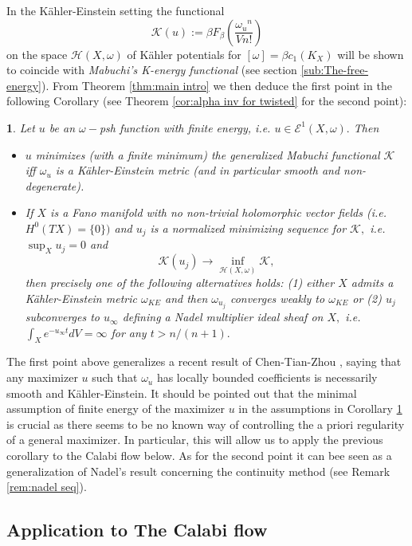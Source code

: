 \documentclass[11pt,oneside,english]{amsart}
\numberwithin{equation}{section}
\numberwithin{figure}{section}
\theoremstyle{plain}
\theoremstyle{plain}
\newtheorem{cor}[thm]{\protect\corollaryname}
\theoremstyle{plain}
\theoremstyle{plain}
\theoremstyle{remark}
\theoremstyle{definition}
\providecommand{\corollaryname}{Corollary}
\begin{document}
In the Kähler-Einstein setting the functional 
\begin{equation}
\mathcal{K}(u):=\beta F_{\beta}(\frac{\omega_{u}{}^{n}}{Vn!})\label{eq:mab f intro}
\end{equation}
 on the space $\mathcal{H}(X,\omega)$ of Kähler potentials for $[\omega]=\beta c_{1}(K_{X})$
will be shown to coincide with \emph{Mabuchi's K-energy functional}
\cite{m2} (see section \ref{sub:The-free-energy}). From Theorem
\ref{thm:main intro} we then deduce the first point in the following
Corollary (see Theorem \ref{cor:alpha inv for twisted} for the second
point): 
\begin{cor}
\label{cor:min of mab intro}Let $u$ be an $\omega-$psh function
with finite energy, i.e. $u\in\mathcal{E}^{1}(X,\omega).$ Then
\begin{itemize}
\item $u$ minimizes (with a finite minimum) the generalized Mabuchi functional
$\mathcal{K}$ iff $\omega_{u}$ is a Kähler-Einstein metric (and
in particular smooth and non-degenerate).
\item If $X$ is a Fano manifold with no non-trivial holomorphic vector
fields (i.e. $H^{0}(TX)=\{0\})$ and $u_{j}$ is a normalized minimizing
sequence for $\mathcal{K},$ i.e. $\sup_{X}u_{j}=0$ and 
\[
\mathcal{K}(u_{j})\rightarrow\inf_{\mathcal{H}(X,\omega)}\mathcal{K},
\]
 then precisely one of the following alternatives holds: (1) either
$X$ admits a Kähler-Einstein metric $\omega_{KE}$ and then $\omega_{u_{j}}$
converges weakly to $\omega_{KE}$ or (2) $u_{j}$ subconverges to
$u_{\infty}$ defining a Nadel multiplier ideal sheaf on $X,$ i.e.
$\int_{X}e^{-u_{\infty}t}dV=\infty$ for any $t>n/(n+1).$
\end{itemize}
\end{cor}
The first point above generalizes a recent result of Chen-Tian-Zhou
\cite{c-t-z}, saying that any maximizer $u$ such that $\omega_{u}$
has locally bounded coefficients is necessarily smooth and Kähler-Einstein.
It should be pointed out that the minimal assumption of finite energy
of the maximizer $u$ in the assumptions in Corollary \ref{cor:min of mab intro}
is crucial as there seems to be no known way of controlling the a
priori regularity of a general maximizer. In particular, this will
allow us to apply the previous corollary to the Calabi flow below.
As for the second point it can bee seen as a generalization of Nadel's
result concerning the continuity method \cite{na} (see Remark \ref{rem:nadel seq}).

\subsection{Application to The Calabi flow}
\end{document}
